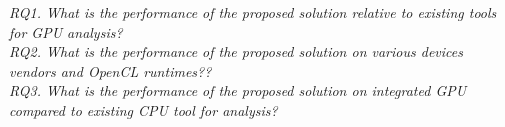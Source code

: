 \textit{RQ1. What is the performance of the proposed solution relative to existing tools for GPU analysis?}\\

\textit{RQ2. What is the performance of the proposed solution on various devices vendors and OpenCL runtimes??}\\

\textit{RQ3. What is the performance of the proposed solution on integrated GPU compared to existing CPU tool for analysis?}\\


